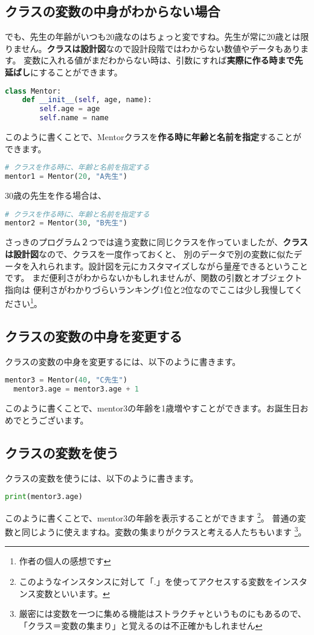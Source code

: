 \subsection{クラスの変数の中身がわからない場合}
でも、先生の年齢がいつも20歳なのはちょっと変ですね。先生が常に20歳とは限りません。\textbf{クラスは設計図}なので設計段階ではわからない数値やデータもあります。
変数に入れる値がまだわからない時は、引数にすれば\textbf{実際に作る時まで先延ばし}にすることができます。
\begin{lstlisting}[caption=引数を使う場合,label=sample, language=Python]
class Mentor:
    def __init__(self, age, name):
        self.age = age
        self.name = name
\end{lstlisting}
このように書くことで、Mentorクラスを\textbf{作る時に年齢と名前を指定}することができます。
\begin{lstlisting}[caption=Mentorクラスの作り方,label=sample, language=Python]
# クラスを作る時に、年齢と名前を指定する
mentor1 = Mentor(20, "A先生")
\end{lstlisting}
30歳の先生を作る場合は、
\begin{lstlisting}[caption=Mentorクラスの作り方,label=sample, language=Python]
# クラスを作る時に、年齢と名前を指定する
mentor2 = Mentor(30, "B先生")
\end{lstlisting}
さっきのプログラム２つでは違う変数に同じクラスを作っていましたが、\textbf{クラスは設計図}なので、クラスを一度作っておくと、
別のデータで別の変数に似たデータを入れられます。設計図を元にカスタマイズしながら量産できるということです。
まだ便利さがわからないかもしれませんが、関数の引数とオブジェクト指向は
便利さがわかりづらいランキング1位と2位なのでここは少し我慢してください\footnote{作者の個人の感想です}。

\subsection{クラスの変数の中身を変更する}
クラスの変数の中身を変更するには、以下のように書きます。
\begin{lstlisting}[caption=クラスの変数の中身を変更する,label=sample, language=Python]
  mentor3 = Mentor(40, "C先生")
  mentor3.age = mentor3.age + 1
\end{lstlisting}
このように書くことで、mentor3の年齢を1歳増やすことができます。お誕生日おめでとうございます。
\subsection{クラスの変数を使う}
クラスの変数を使うには、以下のように書きます。
\begin{lstlisting}[caption=クラスの変数を使う,label=sample, language=Python]
  print(mentor3.age)
\end{lstlisting}
このように書くことで、mentor3の年齢を表示することができます
\footnote{このようなインスタンスに対して「.」を使ってアクセスする変数をインスタンス変数といいます。}。
普通の変数と同じように使えますね。変数の集まりがクラスと考える人たちもいます
\footnote{厳密には変数を一つに集める機能はストラクチャというものにもあるので、「クラス＝変数の集まり」と覚えるのは不正確かもしれません}。

